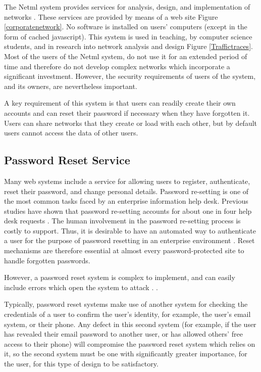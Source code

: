 The Netml system provides services for analysis, design, and implementation
of networks \cite{addie2011netml}. These services are provided by means of a web
site Figure \ref{corporatenetwork}. No software is installed on users' computers (except in the form
of cached javascript). This system is used in teaching, by
computer science students, and in research into network analysis and design Figure  \ref{Traffictraces}. 
\iflonger
Most of the users of the Netml system, do not use it for an extended period of
time and therefore do not develop complex networks which incorporate a significant
investment. However, the security requirements of users of the system, and
its owners, are nevertheless important.
\fi

A key requirement of this system is that users can readily create their own
accounts and can reset their password if necessary when they have forgotten it.
Users can share networks that they create or load with each other, but by default
users cannot access the data of other users.

\subsection{Password Reset Service}
Many web systems include a service for allowing users to register,
authenticate, reset their password, and change personal details.
Password re-setting is one of the most common tasks faced by an
enterprise information help desk. Previous studies have shown that password
re-setting accounts for about one in four help desk requests \cite{bailey2014statistics}. The
human involvement in the password re-setting process is costly to
support. Thus, it is desirable to have an automated way to
authenticate a user for the purpose of password resetting in an
enterprise environment \cite{nimmy2014novel}. Reset mechanisms are therefore
essential at almost every password-protected site to handle forgotten
passwords. 

However, a password reset system is
complex to implement, and can easily include errors which open the system to attack
\iflonger
\cite{routh2018attacks,florencio2014administrator}. 
\else
\cite{routh2018attacks}. 
\fi

Typically, password reset systems make use of another system for checking
the credentials of a user to confirm the user's identity, for example,
the user's email system, or their phone. Any defect
in this second system (for example, if the user has revealed their email password
to another user, or has allowed others' free access to their phone) will compromise the password reset system
which relies on it, so the second system must be one with significantly
greater importance, for the user, for this type of design to be
satisfactory.\\

